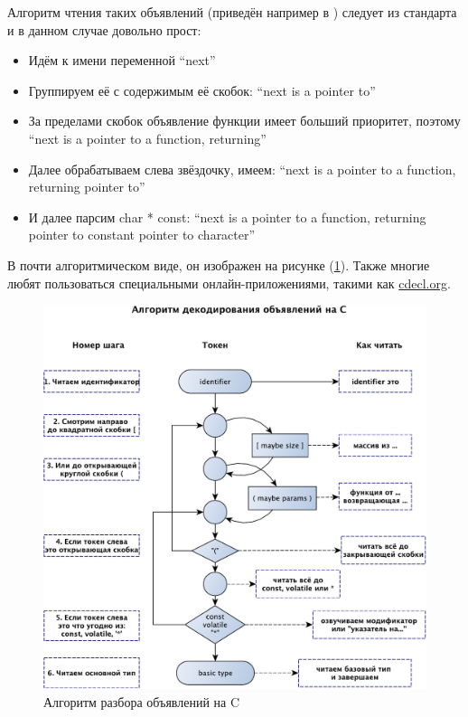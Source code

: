 \documentclass[a4paper,12pt,oneside]{book}
\newif\ifanswers
\begin{document}
\ifanswers
Правильный ответ: указатель на функцию, возвращающую указатель на константный указатель на символ.
\fi

Алгоритм чтения таких объявлений (приведён например в \cite{linden}) следует из стандарта и в данном случае довольно прост:

\begin{itemize}
\item
Идём к имени переменной ``next''
\item
Группируем её с содержимым её скобок: ``next is a pointer to''
\item
За пределами скобок объявление функции имеет больший приоритет, поэтому ``next is a pointer to a function, returning''
\item
Далее обрабатываем слева звёздочку, имеем: ``next is a pointer to a function, returning pointer to''
\item
И далее парсим char * const: ``next is a pointer to a function, returning pointer to constant pointer to character''
\end{itemize}

В почти алгоритмическом виде, он изображен на рисунке (\ref{fig:cdecl_parse}). Также многие любят пользоваться специальными онлайн-приложениями, такими как \url{cdecl.org}.

\begin{figure}[h!]
\centering
\includegraphics[width=1.0\textwidth]{illustrations/cdecls-crop.pdf}
\caption{Алгоритм разбора объявлений на C}
\label{fig:cdecl_parse}
\end{figure}
\end{document}
